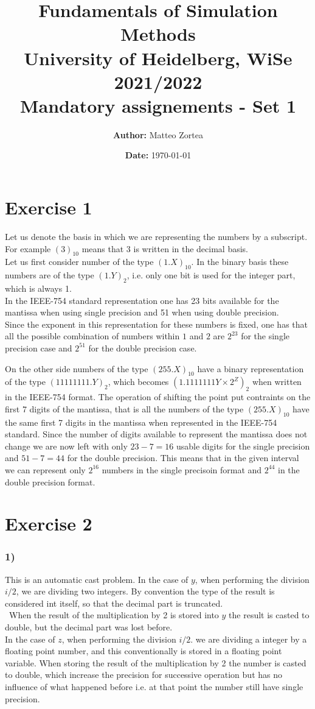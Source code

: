 \documentclass{article}
\title{\textbf{Fundamentals of Simulation Methods} \\ \vspace{5pt} \large University of Heidelberg, WiSe 2021/2022 \\ \vspace{5pt} Mandatory assignements - Set 1}
\date{\textbf{Date:} \today}
\author{\textbf{Author:} Matteo Zortea}
\begin{document}
\maketitle

\section*{Exercise 1}
    Let us denote the basis in which we are representing the numbers by a subscript. For example $(3)_{10}$ means that 3 is written in the decimal basis. \\
    Let us first consider number of the type $(1.X)_{10}$. In the binary basis these numbers are of the type $(1.Y)_2$, i.e. only one bit is used for the integer part, which is always 1. \\
    In the IEEE-754 standard representation one has 23 bits available for the mantissa when using single precision and 51 when using double precision. \\
    Since the exponent in this representation for these numbers is fixed, one has that all the possible combination of numbers within $1$ and $2$ are $2^{23}$ for the single precision case
    and $2^{51}$ for the double precision case. \par
    \vspace{15pt}
    On the other side numbers of the type $(255.X)_{10}$ have a binary representation of the type $(11111111.Y)_2$, which becomes 
    $(1.1111111Y \times 2^Z)_2$ when written in the IEEE-754 format. The operation of shifting the point put contraints on the first 7 digits of the mantissa, that is all the numbers of the type $(255.X)_10$ have the same first 7 digits in the mantissa when represented in the IEEE-754 standard.
    Since the number of digits available to represent the mantissa does not change we are now left with only $23-7=16$ usable digits for the single precision and $51-7=44$ for the double precision. This means that in the given interval we can represent only $2^{16}$ numbers in the single precisoin format 
    and $2^{44}$ in the double precision format.

\section*{Exercise 2}
\subsubsection*{1)}
This is an automatic cast problem. In the case of $y$, when performing the division $i/2$, we are dividing two integers. By convention the type of the result is considered int itself, so that the decimal part is truncated. \\\
When the result of the multiplication by 2 is stored into $y$ the result is casted to double, but the decimal part was lost before. \\
In the case of $z$, when performing the division $i/2.$ we are dividing a integer by a floating point number, and this conventionally is stored in a floating point variable. When storing the result of the multiplication by 2 
the number is casted to double, which increase the precision for successive operation but has no influence of what happened before i.e. at that point the number still have single precision.
\end{document}
